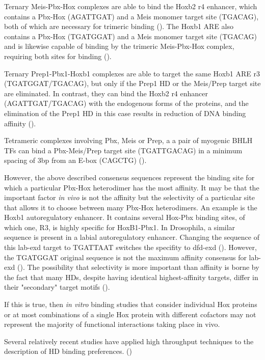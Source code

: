 Ternary Meis-Pbx-Hox complexes are able to bind the Hoxb2 r4 enhancer, which contains a Pbx-Hox (AGATTGAT) and a Meis monomer target site (TGACAG), both of which are necessary for trimeric binding (\cite{Jacobs1999}). The Hoxb1 \ac{ARE} also contains a Pbx-Hox (TGATGGAT) and a Meis monomer target site (TGACAG) and is likewise capable of binding by the trimeric Meis-Pbx-Hox complex, requiring both sites for binding (\cite{Jacobs1999}).

Ternary Prep1-Pbx1-Hoxb1 complexes are able to target the same Hoxb1 \ac{ARE} r3 (TGATGGAT/TGACAG), but only if the Prep1 \ac{HD} or the Meis/Prep target site are eliminated. In contrast, they can bind the Hoxb2 r4 enhancer (AGATTGAT/TGACAG) with the endogenous forms of the proteins, and the elimination of the Prep1 \ac{HD} in this case results in reduction of DNA binding affinity (\cite{Ferretti2000}).

Tetrameric complexes involving Pbx, Meis or Prep, a a pair of myogenic \ac{BHLH} \acp{TF} can bind a Pbx-Meis/Prep target site (TGATTGACAG) in a minimum spacing of 3bp from an E-box (CAGCTG) (\cite{Knoepfler1999}).

However, the above described consensus sequences represent the binding site for which a particular Pbx-Hox heterodimer has the most affinity. It may be that the important factor \textit{in vivo} is not the affinity but the selectivity of a particular site that allows it to choose between many Pbx-Hox heterodimers. An example is the Hoxb1 autoregulatory enhancer. It contains several Hox-Pbx binding sites, of which one, R3, is highly specific for HoxB1-Pbx1. In Drosophila, a similar sequence is present in a labial autoregulatory enhancer. Changing the sequence of this lab-\ac{exd} target to TGATTAAT switches the specifity to dfd-\ac{exd} (\cite{Chan1997}). However, the TGATGGAT original sequence is not the maximum affinity consensus for lab-\ac{exd} (\cite{Mann1998,Shen1997}). The possibility that selectivity is more important than affinity is borne by the fact that many \acp{HD}, despite having identical highest-affinity targets, differ in their "secondary" target motifs (\cite{Berger2008}).

If this is true, then \textit{in vitro} binding studies that consider individual Hox proteins or at most combinations of a single Hox protein with different cofactors may not represent the majority of functional interactions taking place in vivo. 

		
Several relatively recent studies have applied high throughput techniques to the description of \ac{HD} binding preferences. (\cite{Slattery2011,Berger2008,Noyes2008})
		
